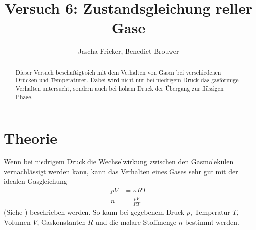 \documentclass[11pt, a4paper]{article}
\title{Versuch 6: Zustandsgleichung reller Gase}
\author{Jascha Fricker, Benedict Brouwer}
\begin{document}
    \maketitle

    

    \begin{abstract}
        Dieser Versuch beschäftigt sich mit dem Verhalten von Gasen bei verschiedenen Drücken und Temperaturen.
        Dabei wird nicht nur bei niedrigem Druck das gasförmige Verhalten untersucht, sondern auch bei hohem Druck
        der Übergang zur flüssigen Phase.
    \end{abstract}

    \tableofcontents

    \newpage

    \section{Theorie}
    Wenn bei niedrigem Druck die Wechselwirkung zwischen den Gasmolekülen vernachlässigt werden kann,
    kann das Verhalten eines Gases sehr gut mit der idealen Gasgleichung
    \begin{align}
        p V &= n R T \nonumber \nonumber\\
        n &= \frac{p V}{R T} \label{eq:ideal}
    \end{align}
    (Siehe \cite[(1)]{ZUS}) beschrieben werden. So kann bei gegebenem Druck $p$, Temperatur $T$, Volumen $V$,
    Gaskonstanten $R$ und die molare Stoffmenge $n$ bestimmt werden. \\
\end{document}
